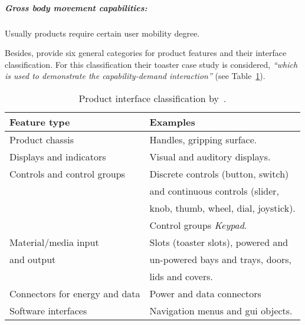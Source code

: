 \subparagraph*{Gross body movement capabilities:}
Usually products require certain user mobility degree. 

\bigskip

Besides, \citeauthor{persad_characterising_2007} provide six general categories 
for product features and their interface classification. For this classification 
their toaster case study is considered, \textit{``which is used to demonstrate 
the capability-demand interaction''} (see Table~\ref{tbl:persad_product_interface}).

\begin{table}
  \caption{Product interface classification by~\citet{persad_characterising_2007}.}
  \label{tbl:persad_product_interface}
\footnotesize
\centering
    \begin{tabular}{l l}
    \hline
    \textbf{Feature type} 	& \textbf{Examples} \\
    \hline
    Product chassis 		& Handles, gripping surface. 		\\
    Displays and indicators 	& Visual and auditory displays. 	\\
    Controls and control groups & Discrete controls (button, switch) 	\\
				& and continuous controls (slider,  	\\
				& knob, thumb, wheel, dial, joystick).	\\
				& Control groups \textit{Keypad}. 	\\
    Material/media input 	& Slots (toaster slots), powered and 	\\
    and output			& un-powered bays and trays, doors, 	\\
				& lids and covers.			\\
    Connectors for energy and data & Power and data connectors 		\\
    Software interfaces 	& Navigation menus and \ac{gui} objects. \\
    \hline
  \end{tabular}
\end{table}

